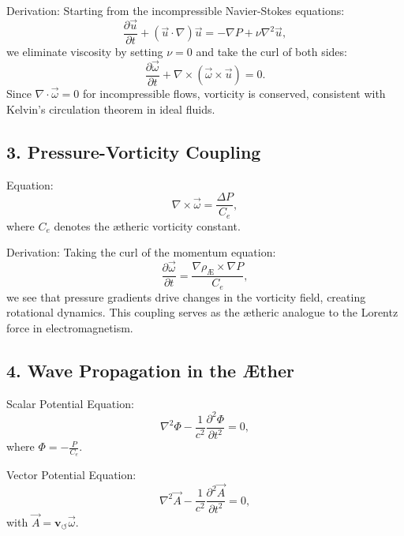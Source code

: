 \documentclass[a4paper,10pt]{article}
\begin{document}
        Derivation:
        Starting from the incompressible Navier-Stokes equations:
        \begin{equation*}
            \frac{\partial \vec{u}}{\partial t} + (\vec{u} \cdot \nabla) \vec{u} = -\nabla P + \nu \nabla^2 \vec{u},
        \end{equation*}
        we eliminate viscosity by setting $\nu = 0$ and take the curl of both sides:
        \begin{equation*}
            \frac{\partial \vec{\omega}}{\partial t} + \nabla \times (\vec{\omega} \times \vec{u}) = 0.
        \end{equation*}
        Since $\nabla \cdot \vec{\omega} = 0$ for incompressible flows, vorticity is conserved, consistent with Kelvin's circulation theorem in ideal fluids.

        \subsection*{3. Pressure-Vorticity Coupling}
        Equation:
        \begin{equation*}
            \nabla \times \vec{\omega} = \frac{\Delta P}{C_e},
        \end{equation*}
        where $C_e$ denotes the ætheric vorticity constant.

        Derivation:
        Taking the curl of the momentum equation:
        \begin{equation*}
            \frac{\partial \vec{\omega}}{\partial t} = \frac{\nabla \rho_\text{Æ} \times \nabla P}{C_e},
        \end{equation*}
        we see that pressure gradients drive changes in the vorticity field, creating rotational dynamics. This coupling serves as the ætheric analogue to the Lorentz force in electromagnetism.

        \subsection*{4. Wave Propagation in the Æther}
        Scalar Potential Equation:
        \begin{equation*}
            \nabla^2 \Phi - \frac{1}{c^2} \frac{\partial^2 \Phi}{\partial t^2} = 0,
        \end{equation*}
        where $\Phi = -\frac{P}{C_e}$.

        Vector Potential Equation:
        \begin{equation*}
            \nabla^2 \vec{A} - \frac{1}{c^2} \frac{\partial^2 \vec{A}}{\partial t^2} = 0,
        \end{equation*}
        with $\vec{A} = \mathbf{v}_{\scriptscriptstyle\boldsymbol{\circlearrowleft}} \vec{\omega}$.
\end{document}
